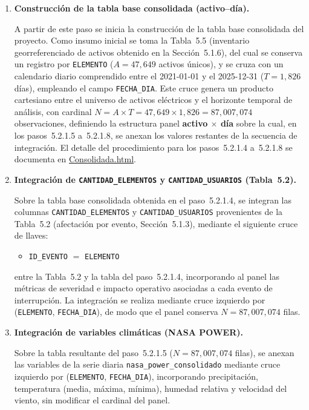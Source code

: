 {\begin{enumerate}
    \item \textbf{Construcción de la tabla base consolidada (activo--día).}\mbox{}\par\vspace{0.2em}\noindent
    A partir de este paso se inicia la construcción de la tabla base consolidada del proyecto. Como insumo inicial se toma la Tabla~5.5 (inventario georreferenciado de activos obtenido en la Sección~5.1.6), del cual se conserva un registro por \texttt{ELEMENTO} ($A = 47{,}649$ activos únicos), y se cruza con un calendario diario comprendido entre el 2021-01-01 y el 2025-12-31 ($T = 1{,}826$ días), empleando el campo \texttt{FECHA\_DIA}. Este cruce genera un producto cartesiano entre el universo de activos eléctricos y el horizonte temporal de análisis, con cardinal $N = A \times T = 47{,}649 \times 1{,}826 = 87{,}007{,}074$ observaciones, definiendo la estructura panel \textbf{activo $\times$ día} sobre la cual, en los pasos~5.2.1.5 a~5.2.1.8, se anexan los valores restantes de la secuencia de integración. El detalle del procedimiento para los pasos~5.2.1.4 a~5.2.1.8 se documenta en \href{\urlconsolidada}{Consolidada.html}.

    \item \textbf{Integración de \texttt{CANTIDAD\_ELEMENTOS} y \texttt{CANTIDAD\_USUARIOS} (Tabla~5.2).}\mbox{}\par\vspace{0.2em}\noindent
    Sobre la tabla base consolidada obtenida en el paso~5.2.1.4, se integran las columnas \texttt{CANTIDAD\_ELEMENTOS} y \texttt{CANTIDAD\_USUARIOS} provenientes de la Tabla~5.2 (afectación por evento, Sección~5.1.3), mediante el siguiente cruce de llaves:
    \begin{itemize}
        \item \texttt{ID\_EVENTO} $=$ \texttt{ELEMENTO}
    \end{itemize}
    \noindent entre la Tabla~5.2 y la tabla del paso~5.2.1.4, incorporando al panel las métricas de severidad e impacto operativo asociadas a cada evento de interrupción. La integración se realiza mediante cruce izquierdo por (\texttt{ELEMENTO}, \texttt{FECHA\_DIA}), de modo que el panel conserva $N = 87{,}007{,}074$ filas.

    \item \textbf{Integración de variables climáticas (NASA POWER).}\mbox{}\par\vspace{0.2em}\noindent
    Sobre la tabla resultante del paso~5.2.1.5 ($N = 87{,}007{,}074$ filas), se anexan las variables de la serie diaria \texttt{nasa\_power\_consolidado} mediante cruce izquierdo por (\texttt{ELEMENTO}, \texttt{FECHA\_DIA}), incorporando precipitación, temperatura (media, máxima, mínima), humedad relativa y velocidad del viento, sin modificar el cardinal del panel.


\end{enumerate}}
